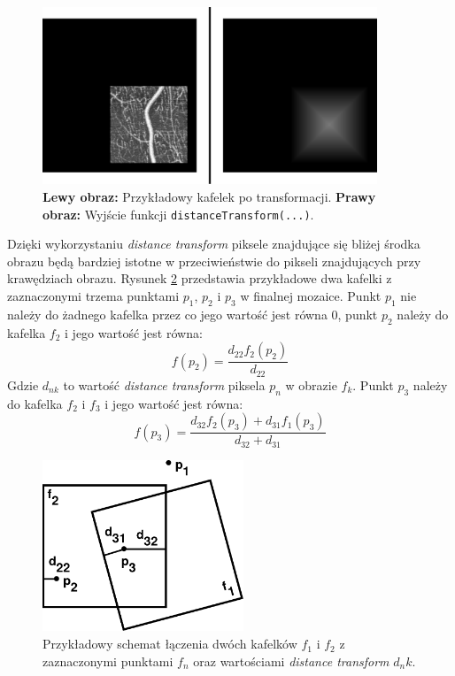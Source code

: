 \begin{figure}[H]
  \centering
  \includegraphics[width=10cm]{gfx/dis}
  \caption{\textbf{Lewy obraz:} Przykładowy kafelek po transformacji. \textbf{Prawy obraz:} Wyjście funkcji \texttt{distanceTransform(...)}.}
  \label{fig:proponowane_algorytmy:dis}
\end{figure}

Dzięki wykorzystaniu \textit{distance transform} piksele znajdujące się bliżej środka obrazu będą bardziej istotne w przeciwieństwie do pikseli znajdujących przy krawędziach obrazu. Rysunek \ref{fig:proponowane_algorytmy:blend} przedstawia przykładowe dwa kafelki z zaznaczonymi trzema punktami $p_1$, $p_2$ i $p_3$ w finalnej mozaice. Punkt $p_1$ nie należy do żadnego kafelka przez co jego wartość jest równa $0$, punkt $p_2$ należy do kafelka $f_2$ i jego wartość jest równa:
\begin{equation}
f(p_2) = \frac{d_{22}f_2(p_2)}{d_{22}}
\end{equation}
Gdzie $d_{nk}$ to wartość \textit{distance transform} piksela $p_n$ w obrazie $f_k$. Punkt $p_3$ należy do kafelka $f_2$ i $f_3$ i jego wartość jest równa:
\begin{equation}
f(p_3) = \frac{d_{32}f_2(p_3) + d_{31}f_1(p_3)}{d_{32} + d_{31}}
\end{equation}
\begin{figure}[H]
  \centering
  \includegraphics[width=6cm]{gfx/blend}
  \caption{Przykładowy schemat łączenia dwóch kafelków $f_1$ i $f_2$ z zaznaczonymi punktami $f_n$ oraz wartościami \textit{distance transform} $d_nk$.}
  \label{fig:proponowane_algorytmy:blend}
\end{figure}

